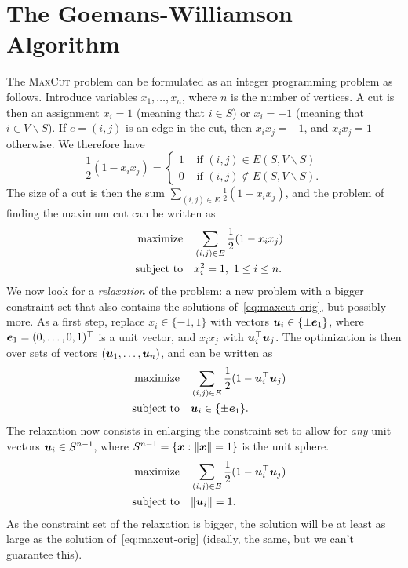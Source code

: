 \section{The Goemans-Williamson Algorithm}
The \textsc{MaxCut} problem can be formulated as an integer programming problem as follows. Introduce variables $x_1,\dots,x_n$, where $n$ is the number of vertices. A cut is then an assignment $x_i=1$ (meaning that $i\in S$) or $x_i=-1$ (meaning that $i\in V\backslash S$). If $e=(i,j)$ is an edge in the cut, then $x_ix_j=-1$, and $x_ix_j=1$ otherwise. We therefore have
\begin{equation*}
 \frac{1}{2}(1-x_ix_j) = \begin{cases}
                          1 & \text{ if } (i,j) \in E(S,V\backslash S)\\
                          0 & \text{ if } (i,j) \not\in E(S,V\backslash S).
                         \end{cases}
\end{equation*}
The size of a cut is then the sum $\sum_{(i,j)\in E} \frac{1}{2}(1-x_ix_j)$, and the problem of finding the maximum cut can be written as
\begin{align}\label{eq:maxcut-orig}
\begin{split}
 \text{maximize}\quad & \sum_{(i,j)\in E} \frac{1}{2}(1-x_ix_j)\\
 \quad\text{subject to}\quad & x_i^2=1, \ 1\leq i\leq n.
\end{split}
 \end{align}
We now look for a {\em relaxation} of the problem: a new problem with a bigger constraint set that also contains the solutions of~\eqref{eq:maxcut-orig}, but possibly more. As a first step, replace $x_i\in \{-1,1\}$ with vectors $\bm{u}_i\in \{\pm \bm{e}_1\}$, where $\bm{e}_1=(0,\dots,0,1)^{\top}$ is a unit vector, and $x_ix_j$ with $\bm{u}_i^{\top}\bm{u}_j$. The optimization is then over sets of vectors $(\bm{u}_1,\dots,\bm{u}_n)$, and can be written as
\begin{align*}
\text{maximize}\quad & \sum_{(i,j)\in E} \frac{1}{2}(1-\bm{u}_i^{\top}\bm{u}_j)\\
\quad\text{subject to}\quad & \bm{u}_i\in \{\pm \bm{e}_1\}.
\end{align*}
The relaxation now consists in enlarging the constraint set to allow for {\em any} unit vectors $\bm{u}_i\in S^{n-1}$, where $S^{n-1}=\{\bm{x}\mathrel{\mathop{:}} \Vert {\bm{x}}\Vert=1\}$ is the unit sphere.
\begin{align}\label{eq:relax1}
\begin{split}
\text{maximize}\quad & \sum_{(i,j)\in E} \frac{1}{2}(1-\bm{u}_i^{\top}\bm{u}_j)\\
\quad\text{subject to}\quad & \Vert {\bm{u}_i}\Vert=1.
\end{split}
\end{align}
As the constraint set of the relaxation is bigger, the solution will be at least as large as the solution of~\eqref{eq:maxcut-orig} (ideally, the same, but we can't guarantee this).

